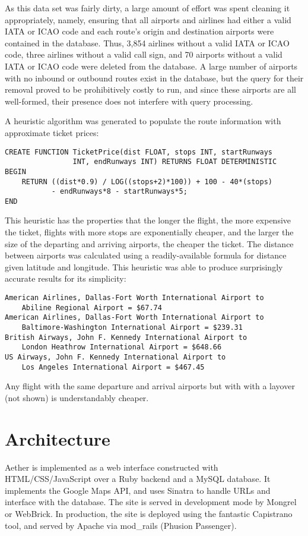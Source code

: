 \documentclass[12pt, letterpaper]{article}
\begin{document}
\indent As this data set was fairly dirty, a large amount of effort was spent cleaning it appropriately, namely, ensuring that all airports and airlines had either a valid IATA or ICAO code and each route's origin and destination airports were contained in the database. Thus, 3,854 airlines without a valid IATA or ICAO code, three airlines without a valid call sign, and 70 airports without a valid IATA or ICAO code were deleted from the database. A large number of airports with no inbound or outbound routes exist in the database, but the query for their removal proved to be prohibitively costly to run, and since these airports are all well-formed, their presence does not interfere with query processing.
	
\indent A heuristic algorithm was generated to populate the route information with approximate ticket prices: 
\begin{verbatim}
CREATE FUNCTION TicketPrice(dist FLOAT, stops INT, startRunways
                INT, endRunways INT) RETURNS FLOAT DETERMINISTIC
BEGIN
    RETURN ((dist*0.9) / LOG((stops+2)*100)) + 100 - 40*(stops)
           - endRunways*8 - startRunways*5;
END
\end{verbatim}
This heuristic has the properties that the longer the flight, the more expensive the ticket, flights with more stops are exponentially cheaper, and the larger the size of the departing and arriving airports, the cheaper the ticket. The distance between airports was calculated using a readily-available formula for distance given latitude and longitude. This heuristic was able to produce surprisingly accurate results for its simplicity:
\begin{verbatim}
American Airlines, Dallas-Fort Worth International Airport to
    Abiline Regional Airport = $67.74 
American Airlines, Dallas-Fort Worth International Airport to
    Baltimore-Washington International Airport = $239.31
British Airways, John F. Kennedy International Airport to
    London Heathrow International Airport = $648.66
US Airways, John F. Kennedy International Airport to 
    Los Angeles International Airport = $467.45
\end{verbatim}
Any flight with the same departure and arrival airports but with with a layover (not shown) is understandably cheaper.

\section{Architecture}
Aether is implemented as a web interface constructed with HTML/CSS/JavaScript over a Ruby backend and a MySQL database. It implements the Google Maps API, and uses Sinatra to handle URLs and interface with the database. The site is served in development mode by Mongrel or WebBrick. In production, the site is deployed using the fantastic Capistrano tool, and served by Apache via mod\_rails (Phusion Passenger).
\end{document}
